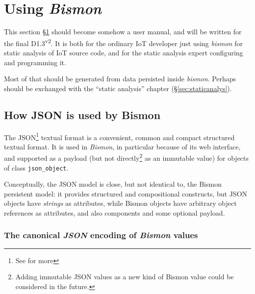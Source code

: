 \section{Using \emph{Bismon}}
\label{sec:using}

This section §\ref{sec:using} should become somehow a user manual, and
will be written for the final D1.3\textsuperscript{v2}. It is both for
the ordinary IoT developer just using \emph{bismon} for static
analysis of IoT source code, and for the static analysis expert
configuring and programming it.

Most of that should be generated from data persisted inside \emph{bismon}. Perhaps
should be exchanged with the ``static analysis'' chapter
(§\ref{sec:staticanalys}).




\subsection{How JSON is used by Bismon}
\label{subsec:json-usage}

The JSON\footnote{See  for more} 
textual format is a convenient, common and compact structured textual
format. It is used in \emph{Bismon}, in particular because of its web
interface, and supported as a payload  (but not
directly\footnote{Adding immutable JSON values as a new kind of Bismon
  value could be considered in the future.} as an immutable value) for
objects of class \texttt{json\_object}.  

Conceptually, the JSON model is close, but not identical to, the
Bismon persistent model: it provides structured and compositional
%
%
%
%
constructs, but JSON objects have \emph{strings} as attributes, while
Bismon objects have arbitrary object references as attributes, and
also components and some optional payload.

\subsubsection{The canonical \emph{JSON} encoding of \emph{Bismon} values}
\label{subsubsec:canonical-json-encoding}

